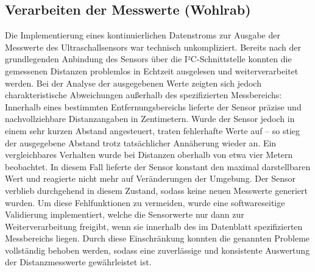 \subsection{Verarbeiten der Messwerte (Wohlrab)}

Die Implementierung eines kontinuierlichen Datenstroms zur Ausgabe der Messwerte des Ultraschallsensors war technisch unkompliziert. 
Bereits nach der grundlegenden Anbindung des Sensors über die I²C-Schnittstelle konnten die gemessenen Distanzen problemlos in Echtzeit ausgelesen und weiterverarbeitet werden.
Bei der Analyse der ausgegebenen Werte zeigten sich jedoch charakteristische Abweichungen außerhalb des spezifizierten Messbereichs: 
Innerhalb eines bestimmten Entfernungsbereichs lieferte der Sensor präzise und nachvollziehbare Distanzangaben in Zentimetern. 
Wurde der Sensor jedoch in einem sehr kurzen Abstand angesteuert, traten fehlerhafte Werte auf – so stieg der ausgegebene Abstand trotz tatsächlicher Annäherung wieder an.
Ein vergleichbares Verhalten wurde bei Distanzen oberhalb von etwa vier Metern beobachtet. 
In diesem Fall lieferte der Sensor konstant den maximal darstellbaren Wert und reagierte nicht mehr auf Veränderungen der Umgebung. 
Der Sensor verblieb durchgehend in diesem Zustand, sodass keine neuen Messwerte generiert wurden.
Um diese Fehlfunktionen zu vermeiden, wurde eine softwareseitige Validierung implementiert, welche die Sensorwerte nur dann zur Weiterverarbeitung freigibt, wenn sie innerhalb des im Datenblatt spezifizierten Messbereichs liegen. 
Durch diese Einschränkung konnten die genannten Probleme vollständig behoben werden, sodass eine zuverlässige und konsistente Auswertung der Distanzmesswerte gewährleistet ist.
